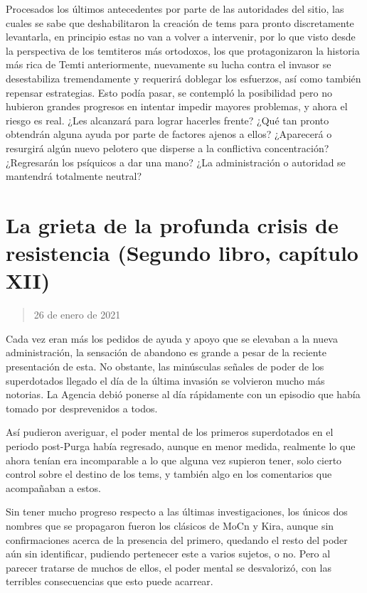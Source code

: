 \documentclass[
]{book}
\begin{document}
Procesados los últimos antecedentes por parte de las autoridades del sitio, las cuales se sabe que deshabilitaron la creación de tems para pronto discretamente levantarla, en principio estas no van a volver a intervenir, por lo que visto desde la perspectiva de los temtiteros más ortodoxos, los que protagonizaron la historia más rica de Temti anteriormente, nuevamente su lucha contra el invasor se desestabiliza tremendamente y requerirá doblegar los esfuerzos, así como también repensar estrategias. Esto podía pasar, se contempló la posibilidad pero no hubieron grandes progresos en intentar impedir mayores problemas, y ahora el riesgo es real. ¿Les alcanzará para lograr hacerles frente? ¿Qué tan pronto obtendrán alguna ayuda por parte de factores ajenos a ellos? ¿Aparecerá o resurgirá algún nuevo pelotero que disperse a la conflictiva concentración? ¿Regresarán los psíquicos a dar una mano? ¿La administración o autoridad se mantendrá totalmente neutral?

\hypertarget{la-grieta-de-la-profunda-crisis-de-resistencia-segundo-libro-capuxedtulo-xii}{%
\section{La grieta de la profunda crisis de resistencia (Segundo libro, capítulo XII)}\label{la-grieta-de-la-profunda-crisis-de-resistencia-segundo-libro-capuxedtulo-xii}}

\begin{quote}
26 de enero de 2021
\end{quote}

Cada vez eran más los pedidos de ayuda y apoyo que se elevaban a la nueva administración, la sensación de abandono es grande a pesar de la reciente presentación de esta. No obstante, las minúsculas señales de poder de los superdotados llegado el día de la última invasión se volvieron mucho más notorias. La Agencia debió ponerse al día rápidamente con un episodio que había tomado por desprevenidos a todos.

Así pudieron averiguar, el poder mental de los primeros superdotados en el periodo post-Purga había regresado, aunque en menor medida, realmente lo que ahora tenían era incomparable a lo que alguna vez supieron tener, solo cierto control sobre el destino de los tems, y también algo en los comentarios que acompañaban a estos.

Sin tener mucho progreso respecto a las últimas investigaciones, los únicos dos nombres que se propagaron fueron los clásicos de MoCn y Kira, aunque sin confirmaciones acerca de la presencia del primero, quedando el resto del poder aún sin identificar, pudiendo pertenecer este a varios sujetos, o no. Pero al parecer tratarse de muchos de ellos, el poder mental se desvalorizó, con las terribles consecuencias que esto puede acarrear.
\end{document}
